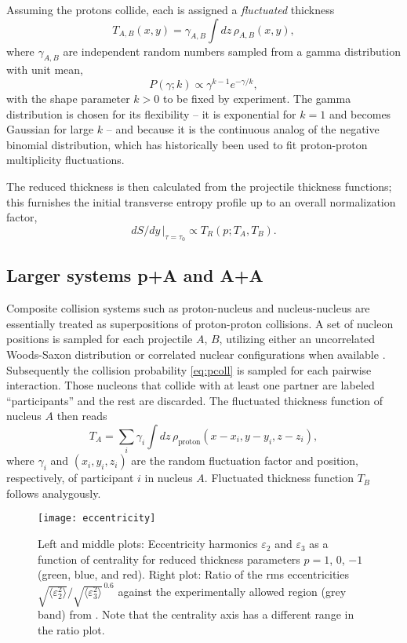 \documentclass[aps,prl,reprint,amsmath,nofootinbib]{revtex4-1}
\newcommand{\eccratio}{\sqrt{\langle \varepsilon_2^2 \rangle}/\sqrt{\langle \varepsilon_3^2 \rangle}^{\,0.6}}
\begin{document}
Assuming the protons collide, each is assigned a \emph{fluctuated} thickness
\begin{equation}
  T_{A,B}(x, y) = \gamma_{A,B} \int dz \, \rho_{A,B}(x, y),
\end{equation}
where $\gamma_{A,B}$ are independent random numbers sampled from a gamma distribution with unit mean,
\begin{equation}
  P(\gamma; k) \propto \gamma^{k-1} e^{-\gamma/k},
\end{equation}
with the shape parameter $k > 0$ to be fixed by experiment.  The gamma distribution is chosen for its
flexibility -- it is exponential for $k = 1$ and becomes Gaussian for large $k$ -- and because it is the
continuous analog of the negative binomial distribution, which has historically been used to fit proton-proton
multiplicity fluctuations.

The reduced thickness is then calculated from the projectile thickness functions; this furnishes the initial
transverse entropy profile up to an overall normalization factor, 
\begin{equation}
dS/dy \, |_{\tau = \tau_0} \propto T_R(p; T_A, T_B).
\end{equation}

\subsection{Larger systems p+A and A+A}

Composite collision systems such as proton-nucleus and nucleus-nucleus are essentially treated as
superpositions of proton-proton collisions.  A set of nucleon positions is sampled for each
projectile $A$, $B$, utilizing either an uncorrelated Woods-Saxon distribution or correlated nuclear configurations 
when available \cite{Alvioli:2009ab}. Subsequently the collision probability \eqref{eq:pcoll} is sampled for each 
pairwise interaction. Those nucleons that collide with at least one partner are labeled ``participants'' and the 
rest are discarded. The fluctuated thickness function of nucleus $A$ then reads
\begin{equation}
  T_A = \sum_i \gamma_i \int dz \, \rho_\text{proton}(x - x_i, y - y_i, z - z_i),
  \label{nuclear thickness}
\end{equation}
where $\gamma_i$ and $(x_i, y_i, z_i)$ are the random fluctuation factor and position, respectively, of
participant $i$ in nucleus $A$. Fluctuated thickness function $T_B$ follows analygously. 

\begin{figure*}[t]
  \texttt{[image: eccentricity]}
  \caption{
    \label{fig:eccen}
    Left and middle plots:  Eccentricity harmonics $\varepsilon_2$ and $\varepsilon_3$ as a function of centrality 
    for reduced thickness parameters $p = 1$, 0, $-1$ (green, blue, and red).  Right plot:  Ratio of the rms eccentricities 
    $\eccratio$ against the experimentally allowed region (grey band) from \cite{Retinskaya:2013gca}.  Note that the centrality 
    axis has a different range in the ratio plot.
  }
\end{figure*}
\end{document}
